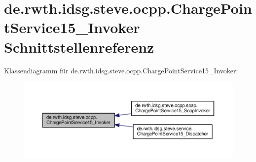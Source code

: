 \hypertarget{interfacede_1_1rwth_1_1idsg_1_1steve_1_1ocpp_1_1_charge_point_service15___invoker}{\section{de.\+rwth.\+idsg.\+steve.\+ocpp.\+Charge\+Point\+Service15\+\_\+\+Invoker Schnittstellenreferenz}
\label{interfacede_1_1rwth_1_1idsg_1_1steve_1_1ocpp_1_1_charge_point_service15___invoker}
}


Klassendiagramm für de.\+rwth.\+idsg.\+steve.\+ocpp.\+Charge\+Point\+Service15\+\_\+\+Invoker\+:\nopagebreak
\begin{figure}[H]
\begin{center}
\leavevmode
\includegraphics[width=350pt]{interfacede_1_1rwth_1_1idsg_1_1steve_1_1ocpp_1_1_charge_point_service15___invoker__inherit__graph}
\end{center}
\end{figure}

